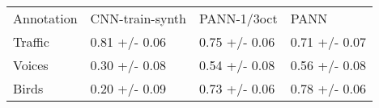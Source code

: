 \begin{tabular}{llll}
Annotation & CNN-train-synth & PANN-1/3oct & PANN \\
Traffic & 0.81 +/- 0.06 & 0.75 +/- 0.06 & 0.71 +/- 0.07 \\
Voices & 0.30 +/- 0.08 & 0.54 +/- 0.08 & 0.56 +/- 0.08 \\
Birds & 0.20 +/- 0.09 & 0.73 +/- 0.06 & 0.78 +/- 0.06 \\
\end{tabular}
